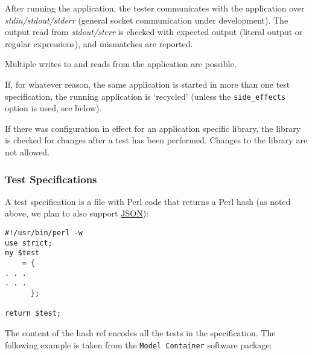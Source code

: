 \documentclass[12pt]{article}
\begin{document}
After running the application, the tester communicates with the application over {\it stdin/stdout/stderr} (general socket communication under development). The output read from {\it stdout/sterr} is checked with expected output (literal output or regular expressions), and mismatches are reported.

Multiple writes to and reads from the application are possible.

If, for whatever reason, the same application is started in more than one test specification, the running application is `recycled' (unless the {\tt side\_effects} option is used, see below).

If there was configuration in effect for an application specific library, the library is checked for changes after a test has been performed. Changes to the library are not allowed.

\subsubsection*{Test Specifications}

A test specification is a file with Perl code that returns a Perl hash (as noted above, we plan to also support \href{http://www.json.org/}{JSON}):

\begin{verbatim}
#!/usr/bin/perl -w
use strict;
my $test
    = {
. . .
. . . 
      };

return $test;

\end{verbatim}
The content of the hash ref encodes all the tests in the specification. The following example is taken from the {\tt Model Container} software package:
\end{document}
